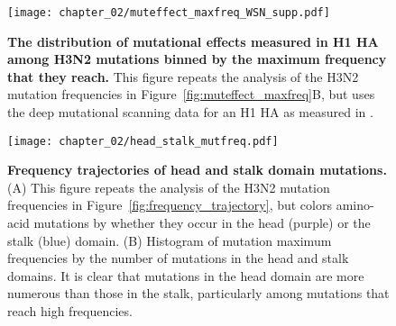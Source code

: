 \begin{figure}
\centerline{\texttt{[image: chapter\_02/muteffect\_maxfreq\_WSN\_supp.pdf]}}
\caption{\label{suppfig:muteffect_maxfreq_WSN_supp}
{\bf The distribution of mutational effects measured in H1 HA among H3N2 mutations binned by the maximum frequency that they reach.}
This figure repeats the analysis of the H3N2 mutation frequencies in Figure~\ref{fig:muteffect_maxfreq}B, but uses the deep mutational scanning data for an H1 HA as measured in \citet{Doud:2016gm}.
}
\end{figure}

\begin{figure}
\centerline{\texttt{[image: chapter\_02/head\_stalk\_mutfreq.pdf]}}
\caption{\label{suppfig:head_stalk_mutfreq_supp}
{\bf Frequency trajectories of head and stalk domain mutations.}
(A) This figure repeats the analysis of the H3N2 mutation frequencies in Figure~\ref{fig:frequency_trajectory}, but colors amino-acid mutations by whether they occur in the head (purple) or the stalk (blue) domain.
(B) Histogram of mutation maximum frequencies by the number of mutations in the head and stalk domains.
It is clear that mutations in the head domain are more numerous than those in the stalk, particularly among mutations that reach high frequencies.
}
\end{figure}
